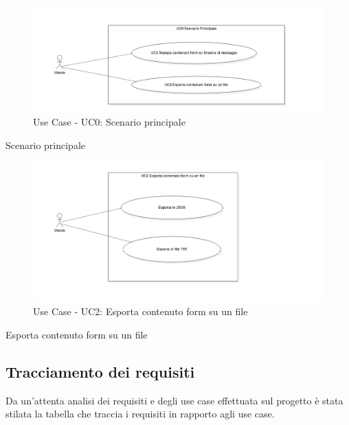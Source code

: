\begin{figure}[!h] 
	\centering 
	\includegraphics[scale = 0.4]{immagini/usecase/usecase-addon-uc0.png} 
	\caption{Use Case - UC0: Scenario principale}
\end{figure}
\begin{usecase}{0}{Scenario principale}
	\label{uc:scenario-principale}
\end{usecase}
\begin{figure}[!h] 
	\centering 
	\includegraphics[scale = 0.4]{immagini/usecase/usecase-addon-uc2.png} 
	\caption{Use Case - UC2: Esporta contenuto form su un file}
\end{figure}
\begin{usecase}{2}{Esporta contenuto form su un file}
	\label{uc:esporta-file}
\end{usecase}

\newpage

\subsection{Tracciamento dei requisiti}
Da un'attenta analisi dei requisiti e degli use case effettuata sul progetto è stata stilata la tabella che traccia i requisiti in rapporto agli use case.

